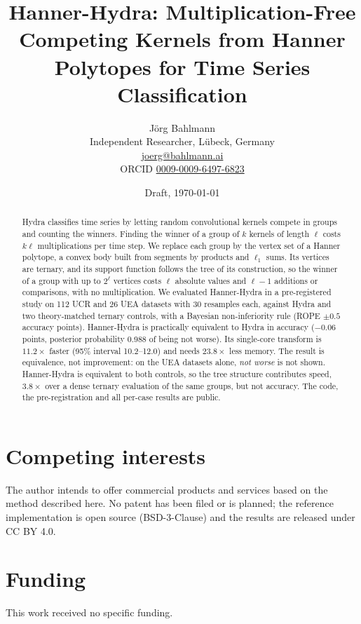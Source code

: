 \documentclass[11pt]{article}
\title{Hanner-Hydra: Multiplication-Free Competing Kernels from Hanner Polytopes
  for Time Series Classification}
\author{J\"org Bahlmann\\\small Independent Researcher, L\"ubeck, Germany\\\small \href{mailto:joerg@bahlmann.ai}{joerg@bahlmann.ai}\\\small ORCID \href{https://orcid.org/0009-0009-6497-6823}{0009-0009-6497-6823}}
\date{Draft, \today}
\theoremstyle{definition}
\newcommand{\hh}{Hanner-Hydra}
\begin{document}
\maketitle

\begin{abstract}
Hydra classifies time series by letting random convolutional kernels compete in groups and
counting the winners. Finding the winner of a group of $k$ kernels of length $\ell$ costs
$k\ell$ multiplications per time step. We replace each group by the vertex set of a Hanner
polytope, a convex body built from segments by products and $\ell_1$ sums. Its vertices are
ternary, and its support function follows the tree of its construction, so the winner of a
group with up to $2^\ell$ vertices costs $\ell$ absolute values and $\ell-1$ additions or
comparisons, with no multiplication. We evaluated \hh{} in a pre-registered study on 112
UCR and 26 UEA datasets with 30 resamples each, against Hydra and two theory-matched
ternary controls, with a Bayesian non-inferiority rule (ROPE $\pm0.5$ accuracy points).
\hh{} is practically equivalent to Hydra in accuracy ($-0.06$ points, posterior
probability 0.988 of being not worse). Its single-core transform is $11.2\times$ faster
(95\% interval 10.2--12.0) and needs $23.8\times$ less memory. The result is equivalence,
not improvement: on the UEA datasets alone, \emph{not worse} is not shown. \hh{} is
equivalent to both controls, so the tree structure contributes speed, $3.8\times$ over a
dense ternary evaluation of the same groups, but not accuracy. The code, the
pre-registration and all per-case results are public.
\end{abstract}










\section*{Competing interests}
The author intends to offer commercial products and services based on the method described
here. No patent has been filed or is planned; the reference implementation is open source
(BSD-3-Clause) and the results are released under CC BY 4.0.

\section*{Funding}
This work received no specific funding.



\end{document}
